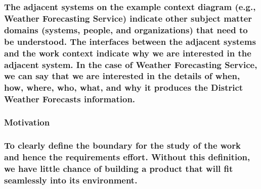 \documentclass[
]{article}
\begin{document}
\hypertarget{the-adjacent-systems-on-the-example-context-diagram-e.g.-weather-forecasting-service-indicate-other-subject-matter-domains-systems-people-and-organizations-that-need-to-be-understood.-the-interfaces-between-the-adjacent-systems-and-the-work-context-indicate-why-we-are-interested-in-the-adjacent-system.-in-the-case-of-weather-forecasting-service-we-can-say-that-we-are-interested-in-the-details-of-when-how-where-who-what-and-why-it-produces-the-district-weather-forecasts-information.}{%
\subsubsection{The adjacent systems on the example context diagram
(e.g., Weather Forecasting Service) indicate other subject matter
domains (systems, people, and organizations) that need to be understood.
The interfaces between the adjacent systems and the work context
indicate why we are interested in the adjacent system. In the case of
Weather Forecasting Service, we can say that we are interested in the
details of when, how, where, who, what, and why it produces the District
Weather Forecasts
information.}\label{the-adjacent-systems-on-the-example-context-diagram-e.g.-weather-forecasting-service-indicate-other-subject-matter-domains-systems-people-and-organizations-that-need-to-be-understood.-the-interfaces-between-the-adjacent-systems-and-the-work-context-indicate-why-we-are-interested-in-the-adjacent-system.-in-the-case-of-weather-forecasting-service-we-can-say-that-we-are-interested-in-the-details-of-when-how-where-who-what-and-why-it-produces-the-district-weather-forecasts-information.}}

\hypertarget{section-5}{%
\subsubsection{}\label{section-5}}

\hypertarget{motivation-23}{%
\subsubsection{Motivation}\label{motivation-23}}

\hypertarget{to-clearly-define-the-boundary-for-the-study-of-the-work-and-hence-the-requirements-effort.-without-this-definition-we-have-little-chance-of-building-a-product-that-will-fit-seamlessly-into-its-environment.}{%
\subsubsection{To clearly define the boundary for the study of the work
and hence the requirements effort. Without this definition, we have
little chance of building a product that will fit seamlessly into its
environment.}\label{to-clearly-define-the-boundary-for-the-study-of-the-work-and-hence-the-requirements-effort.-without-this-definition-we-have-little-chance-of-building-a-product-that-will-fit-seamlessly-into-its-environment.}}
\end{document}
